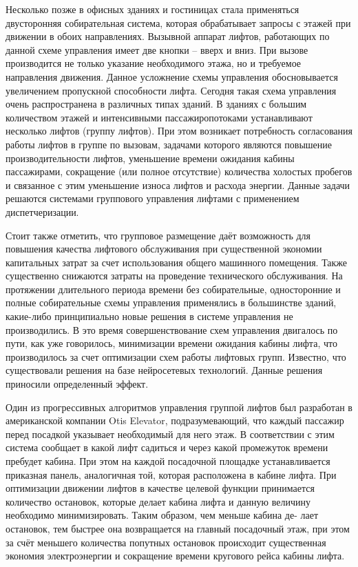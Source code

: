 	Несколько позже в офисных зданиях и гостиницах стала применяться двусторонняя собирательная система,
		которая обрабатывает запросы с этажей при движении в обоих направлениях. Вызывной аппарат лифтов,
		работающих по данной схеме управления имеет две кнопки – вверх и вниз.
		При вызове производится не только указание необходимого этажа, но и требуемое направления движения.
		Данное усложнение схемы управления обосновывается увеличением пропускной способности лифта.
		Сегодня такая схема управления очень распространена в различных типах зданий.
		В зданиях с большим количеством этажей и интенсивными пассажиропотоками устанавливают
		несколько лифтов (группу лифтов). При этом возникает потребность согласования работы
		лифтов в группе по вызовам, задачами которого являются повышение производительности лифтов,
		уменьшение времени ожидания кабины пассажирами, сокращение (или полное отсутствие)
		количества холостых пробегов и связанное с этим уменьшение износа лифтов и расхода энергии.
		Данные задачи решаются системами группового управления лифтами с применением диспетчеризации.

	Стоит также отметить, что групповое размещение даёт возможность для повышения
		качества лифтового обслуживания при существенной экономии капитальных затрат
		за счет использования общего машинного помещения. Также существенно снижаются
		затраты на проведение технического обслуживания. На протяжении длительного периода
		времени без собирательные, односторонние и полные собирательные схемы управления
		применялись в большинстве зданий, какие-либо принципиально новые решения в системе управления не производились.
		В это время совершенствование схем управления двигалось по пути, как уже говорилось,
		минимизации времени ожидания кабины лифта, что производилось за счет оптимизации схем работы лифтовых групп.
		Известно, что существовали решения на базе нейросетевых технологий.
		Данные решения приносили определенный эффект.

	Один из прогрессивных алгоритмов
		управления группой лифтов был разработан в американской компании Otis Elevator,
		подразумевающий, что каждый пассажир перед посадкой указывает необходимый для него этаж.
		В соответствии с этим система сообщает в какой лифт садиться
		и через какой промежуток времени пребудет кабина. При этом на каждой посадочной площадке
		устанавливается приказная панель, аналогичная той, которая расположена в кабине лифта.
		При оптимизации движении лифтов в качестве целевой функции принимается количество остановок,
		которые делает кабина лифта и данную величину необходимо минимизировать.
		Таким образом, чем меньше кабина де- лает остановок, тем быстрее она возвращается
		на главный посадочный этаж, при этом за счёт меньшего количества попутных остановок
		происходит существенная экономия электроэнергии и сокращение времени кругового рейса кабины лифта.

